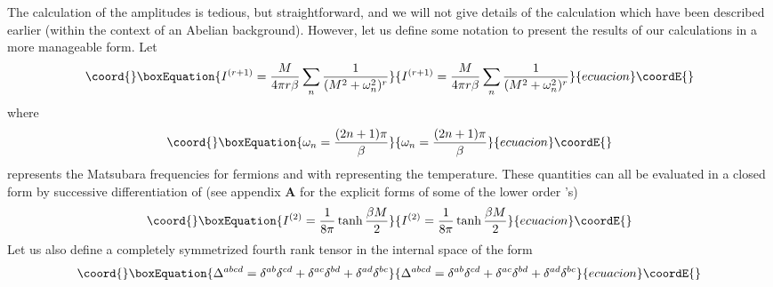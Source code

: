 \documentclass[a4paper,12pt]{article}
\begin{document}
The calculation of the amplitudes is tedious, but straightforward, 
and we will not give details of the calculation which
have been described earlier \cite{Brandt:2000dd, Brandt:2001jc}
(within the  context of an Abelian
background). However, let us define some notation to
present the results of our calculations in a more manageable form. Let
\begin{equation}\coord{}\boxEquation{\label{Isum}
I^{(r+1)} = {M\over 4\pi r\beta} \sum_{n} {1\over
  (M^{2}+\omega_{n}^{2})^{r}}\label{4}
}{I^{(r+1)} = {M\over 4\pi r\beta} \sum_{n} {1\over
  (M^{2}+\omega_{n}^{2})^{r}}}{ecuacion}\coordE{}\end{equation}
where
\begin{equation}\coord{}\boxEquation{
\omega_{n} = {(2n+1)\pi\over \beta}
}{
\omega_{n} = {(2n+1)\pi\over \beta}
}{ecuacion}\coordE{}\end{equation}
represents the Matsubara frequencies for fermions and \coordHE{} with \coordHE{} representing the temperature. These quantities
can all be evaluated in a closed form by successive differentiation of
(see appendix {\bf A} for the explicit forms of some of the lower order
\coordHE{}'s)
\begin{equation}\coord{}\boxEquation{
I^{(2)} = {1\over 8\pi} \tanh {\beta M\over 2}
}{
I^{(2)} = {1\over 8\pi} \tanh {\beta M\over 2}
}{ecuacion}\coordE{}\end{equation}
Let us also define a completely symmetrized fourth rank tensor in the
internal space of the form
\begin{equation}\coord{}\boxEquation{
\Delta^{abcd} = \delta^{ab}\delta^{cd} + \delta^{ac}\delta^{bd} +
\delta^{ad}\delta^{bc}\label{4a}
}{
\Delta^{abcd} = \delta^{ab}\delta^{cd} + \delta^{ac}\delta^{bd} +
\delta^{ad}\delta^{bc}}{ecuacion}\coordE{}\end{equation}
\end{document}
